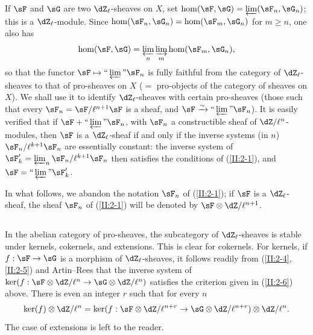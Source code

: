 If $\sF$ and $\sG$ are two $\dZ_\ell$-sheaves on $X$, set
$\hom(\sF,\sG) = \varprojlim(\sF_n,\sG_n)$; this is a $\dZ_\ell$-module.
Since $\hom(\sF_n,\sG_n) = \hom(\sF_m,\sG_n)$ for $m\geqslant n$, one also
has
\[
  \hom(\sF,\sG) = \varprojlim_n \varinjlim_m \hom(\sF_m,\sG_n) \text{,}
\]
so that the functor $\sF\mapsto \text{``}\varprojlim\text{''}\sF_n$ is fully
faithful from the category of $\dZ_\ell$-sheaves to that of pro-sheaves on
$X$ ($=$ pro-objects of the category of sheaves on $X$). We shall use it to
identify $\dZ_\ell$-sheaves with certain pro-sheaves (those such that every
$\sF_n=\sF/\ell^{n+1}\sF$ is a sheaf, and
$\sF\iso \text{``}\varprojlim\text{''}\sF_n$). It is easily verified that if
$\sF+\text{``}\varprojlim\text{''}\sF_n$, with $\sF_n$ a constructible sheaf
of $\dZ/\ell^n$-modules, then $\sF$ is a $\dZ_\ell$-sheaf if and only if the
inverse systems (in $n$) $\sF_n/\ell^{k+1}\sF_n$ are essentially constant:
the inverse system of
$\sF_k'=\varprojlim_n\sF_n/\ell^{k+1}\sF_n$ then satisfies the conditions of
(\ref{II:2-1}), and
$\sF=\text{``}\varprojlim\text{''}\sF_k'$.

In what follows, we abandon the notation $\sF_n$ of (\ref{II:2-1}); if
$\sF$ is a $\dZ_\ell$-sheaf, the sheaf $\sF_n$ of (\ref{II:2-1}) will be
denoted by $\sF\otimes\dZ/\ell^{n+1}$.






\subsection{}\label{II:2-7}

In the abelian category of pro-sheaves, the subcategory of
$\dZ_\ell$-sheaves is stable under kernels, cokernels, and extensions. This is
clear for cokernels. For kernels, if $f:\sF\to\sG$ is a morphism of
$\dZ_\ell$-sheaves, it follows readily from
(\ref{II:2-4}, \ref{II:2-5}) and Artin--Rees that the inverse system of
$\ker(f:\sF\otimes\dZ/\ell^n\to\sG\otimes\dZ/\ell^n)$ satisfies the
criterion given in (\ref{II:2-6}) above. There is even an integer $r$ such
that for every $n$
\[
  \ker(f)\otimes\dZ/\ell^n = \ker(f:\sF\otimes\dZ/\ell^{n+r}\to\sG\otimes\dZ/\ell^{n+r})\otimes\dZ/\ell^n \text{.}
\]
The case of extensions is left to the reader.






\subsection{}\label{II:2-8}

